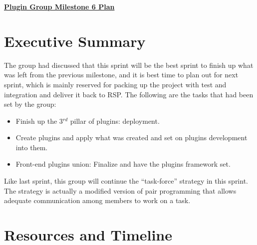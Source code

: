 \documentclass{article}
\begin{document}
\pagestyle{headings}

\begin{center}
{\large\textbf{\underline{Plugin Group Milestone 6 Plan}}}
\end{center}

\section*{Executive Summary}

The group had discussed that this sprint will be the best sprint to finish up what was left from the previous milestone, and it is best time to plan out for next sprint, which is mainly reserved for packing up the project with test and integration and deliver it back to RSP. The following are the tasks that had been set by the group:

\begin{itemize}
	\item Finish up the 3$^{rd}$ pillar of plugins: deployment.
	\item Create plugins and apply what was created and set on plugins development into them. 
	\item Front-end plugins union: Finalize and have the plugins framework set. 
\end{itemize}

Like last sprint, this group will continue the ``task-force'' strategy in this sprint. The strategy is actually a modified version of pair programming that allows adequate communication among members to work on a task. 

\section*{Resources and Timeline}
\end{document}
